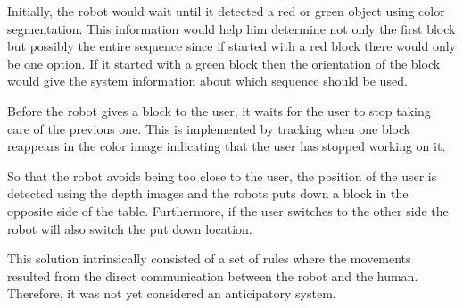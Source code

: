 Initially, the robot would wait until it detected a red or green object using color segmentation. This information would help him determine not only the first block but possibly the entire sequence since if started with a red block there would only be one option. If it started with a green block then the orientation of the block would give the system information about which sequence should be used.

Before the robot gives a block to the user, it waits for the user to stop taking care of the previous one. This is implemented by tracking when one block reappears in the color image indicating that the user has stopped working on it.

So that the robot avoids being too close to the user, the position of the user is detected using the depth images and the robots puts down a block in the opposite side of the table. Furthermore, if the user switches to the other side the robot will also switch the put down location.

This solution intrinsically consisted of a set of rules where the movements resulted from the direct communication between the robot and the human. Therefore, it was not yet considered an anticipatory system.